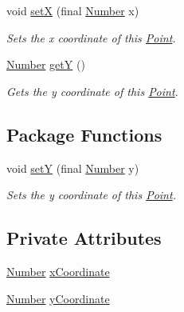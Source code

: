 \begin{DoxyCompactItemize}
void \hyperlink{classcom_1_1aarrelaakso_1_1drawl_1_1_point_acf1cca24c7cf879f402e1b549a5e3864}{setX} (final \hyperlink{interfacecom_1_1aarrelaakso_1_1drawl_1_1_number}{Number} x)
\begin{DoxyCompactList}\small\item\em Sets the x coordinate of this \hyperlink{classcom_1_1aarrelaakso_1_1drawl_1_1_point}{Point}. \end{DoxyCompactList}\item 
\hyperlink{interfacecom_1_1aarrelaakso_1_1drawl_1_1_number}{Number} \hyperlink{classcom_1_1aarrelaakso_1_1drawl_1_1_point_a8247f55c36600e067be27a1586255767}{getY} ()
\begin{DoxyCompactList}\small\item\em Gets the y coordinate of this \hyperlink{classcom_1_1aarrelaakso_1_1drawl_1_1_point}{Point}. \end{DoxyCompactList}\end{DoxyCompactItemize}
\subsection*{Package Functions}
\begin{DoxyCompactItemize}
\item 
void \hyperlink{classcom_1_1aarrelaakso_1_1drawl_1_1_point_a713f16e843349993ac2b79bc05b5aeb6}{setY} (final \hyperlink{interfacecom_1_1aarrelaakso_1_1drawl_1_1_number}{Number} y)
\begin{DoxyCompactList}\small\item\em Sets the y coordinate of this \hyperlink{classcom_1_1aarrelaakso_1_1drawl_1_1_point}{Point}. \end{DoxyCompactList}\end{DoxyCompactItemize}
\subsection*{Private Attributes}
\begin{DoxyCompactItemize}
\item 
\hyperlink{interfacecom_1_1aarrelaakso_1_1drawl_1_1_number}{Number} \hyperlink{classcom_1_1aarrelaakso_1_1drawl_1_1_point_aa5144c5cca82c86f845bead6d4a51041}{x\+Coordinate}
\item 
\hyperlink{interfacecom_1_1aarrelaakso_1_1drawl_1_1_number}{Number} \hyperlink{classcom_1_1aarrelaakso_1_1drawl_1_1_point_ab84afea50a66677c32ed2fd3100838c7}{y\+Coordinate}
\end{DoxyCompactItemize}


